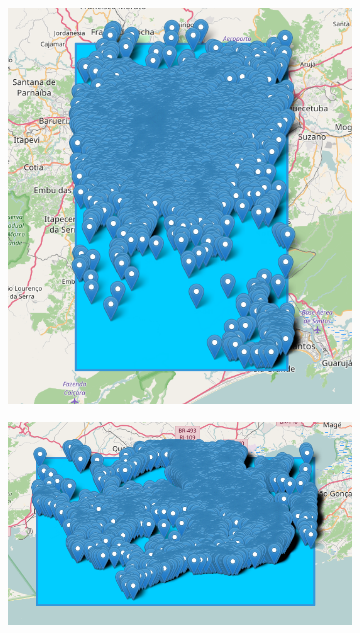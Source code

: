\begin{figure}[!htbp]
	\begin{subfigure}[htbp]{0.4\textwidth}
		\centering
		\includegraphics[width=1\linewidth]{figures/sp_markers.png}
		\caption{}
		\label{subfig:saopaulo_markers}
	\end{subfigure}
	\quad
	\begin{subfigure}[htbp]{0.5\textwidth}
		\centering
		\includegraphics[width=1\linewidth]{figures/rio_markers.png}
		\caption{}
		\label{subfig:riodejaneiro_markers}
	\end{subfigure}
	

\end{figure}
